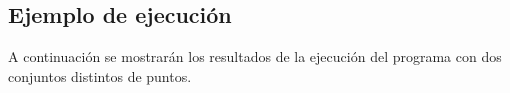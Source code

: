 \documentclass[12pt]{article}
\begin{document}
\subsection{Ejemplo de ejecución}
A continuación se mostrarán los resultados de la ejecución del programa con dos conjuntos distintos de puntos.

\begin{figure}[H]
	\centering
	\hfill
\end{figure}

\begin{figure}[H]
	\centering
	\hfill
\end{figure}
\end{document}
